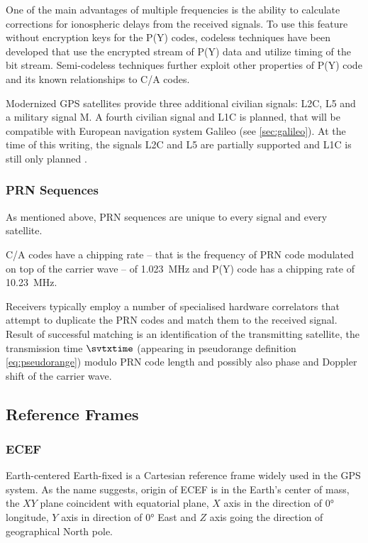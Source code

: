 One of the main advantages of multiple frequencies is the ability to calculate corrections for ionospheric delays from the received signals.
To use this feature without encryption keys for the P(Y) codes, codeless techniques have been developed
that use the encrypted stream of P(Y) data and utilize timing of the bit stream.
Semi-codeless techniques further exploit other properties of P(Y) code and its known relationships to C/A codes.

Modernized GPS satellites provide three additional civilian signals:
L2C, L5 and a military signal M. A fourth civilian signal and L1C is planned, that will be compatible with
European navigation system Galileo (see \ref{sec:galileo}).
At the time of this writing, the signals L2C and L5 are partially supported and L1C is still only
planned \cite{gps-modernization-www}.

\subsubsection{PRN Sequences}
As mentioned above, PRN sequences are unique to every signal and every satellite.

C/A codes have a chipping rate -- that is the frequency of PRN code modulated on top
of the carrier wave -- of \SI{1.023}{\mega\hertz} and P(Y) code has a chipping rate
of \SI{10.23}{\mega\hertz}.

Receivers typically employ a number of specialised hardware correlators
that attempt to duplicate the PRN codes and match them to the received signal.
Result of successful matching is an identification of the transmitting satellite,
the transmission time \(\svtxtime\) (appearing in pseudorange definition \eqref{eq:pseudorange})
modulo PRN code length and possibly also phase and Doppler shift of the carrier wave.

\subsection{Reference Frames}
\label{sec:ref-frames}

\subsubsection{ECEF}
Earth-centered Earth-fixed is a Cartesian reference frame widely used in the GPS system.
As the name suggests, origin of ECEF is in the Earth's center of mass, the \(XY\) plane coincident
with equatorial plane, \(X\) axis in the direction of
\ang{0} longitude, \(Y\) axis in direction of \ang{0} East and \(Z\) axis going
the direction of geographical North pole.


